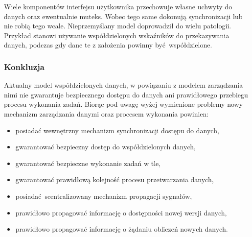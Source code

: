 Wiele komponentów interfejsu użytkownika przechowuje własne uchwyty do danych oraz ewentualnie muteks. Wobec tego same dokonują synchronizacji lub nie robią tego wcale. Nieprzemyślany model doprowadził do wielu patologii. Przykład stanowi używanie współdzielonych wskaźników do przekazywania danych, podczas gdy dane te z założenia powinny być współdzielone.

\subsubsection{Konkluzja}

Aktualny model współdzielonych danych, w powiązaniu z modelem zarządzania nimi nie gwarantuje bezpiecznego dostępu do danych ani prawidłowego przebiegu procesu wykonania zadań. Biorąc pod uwagę wyżej wymienione problemy nowy mechanizm zarządzania danymi oraz procesem wykonania powinien: 
\begin{itemize}
	\item posiadać wewnętrzny mechanizm synchronizacji dostępu do danych,
	\item gwarantować bezpieczny dostęp do współdzielonych danych,
	\item gwarantować bezpieczne wykonanie zadań w tle,
	\item gwarantować prawidłową kolejność procesu przetwarzania danych,
	\item posiadać scentralizowany mechanizm propagacji sygnałów,
	\item prawidłowo propagować informację o dostępności nowej wersji danych,
	\item prawidłowo propagować informację o żądaniu obliczeń nowych danych.
\end{itemize}





